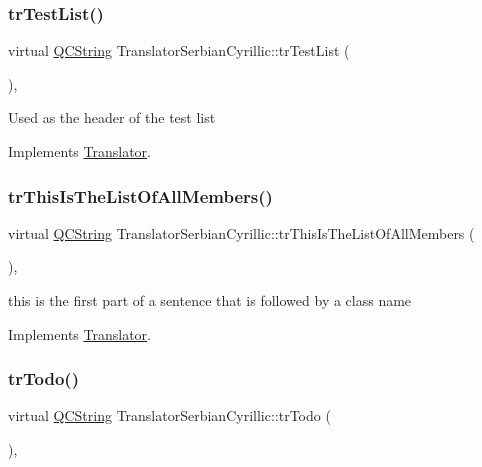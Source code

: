 \subsubsection{\texorpdfstring{trTestList()}{trTestList()}}
{\footnotesize\ttfamily virtual \mbox{\hyperlink{class_q_c_string}{Q\+C\+String}} Translator\+Serbian\+Cyrillic\+::tr\+Test\+List (\begin{DoxyParamCaption}{ }\end{DoxyParamCaption})\hspace{0.3cm}{\ttfamily [inline]}, {\ttfamily [virtual]}}

Used as the header of the test list 

Implements \mbox{\hyperlink{class_translator}{Translator}}.

\mbox{\label{class_translator_serbian_cyrillic_afe29538cfba508afd2c82911588fd3ac}} 
\subsubsection{\texorpdfstring{trThisIsTheListOfAllMembers()}{trThisIsTheListOfAllMembers()}}
{\footnotesize\ttfamily virtual \mbox{\hyperlink{class_q_c_string}{Q\+C\+String}} Translator\+Serbian\+Cyrillic\+::tr\+This\+Is\+The\+List\+Of\+All\+Members (\begin{DoxyParamCaption}{ }\end{DoxyParamCaption})\hspace{0.3cm}{\ttfamily [inline]}, {\ttfamily [virtual]}}

this is the first part of a sentence that is followed by a class name 

Implements \mbox{\hyperlink{class_translator}{Translator}}.

\mbox{\label{class_translator_serbian_cyrillic_ae2667ef1006188c09f176692db4d9cef}} 
\subsubsection{\texorpdfstring{trTodo()}{trTodo()}}
{\footnotesize\ttfamily virtual \mbox{\hyperlink{class_q_c_string}{Q\+C\+String}} Translator\+Serbian\+Cyrillic\+::tr\+Todo (\begin{DoxyParamCaption}{ }\end{DoxyParamCaption})\hspace{0.3cm}{\ttfamily [inline]}, {\ttfamily [virtual]}}

